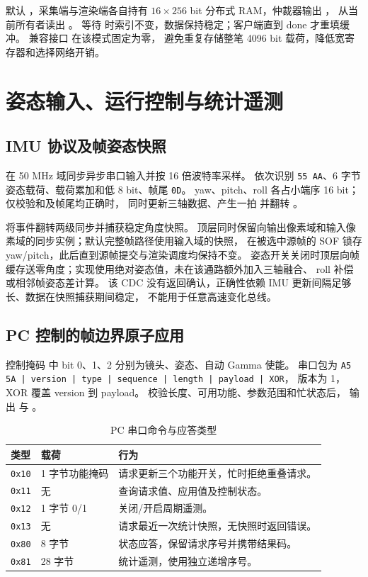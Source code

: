 默认 ，采集端与渲染端各自持有
$16\times256$ bit 分布式 RAM，仲裁器输出 ，
从当前所有者读出 。
等待  时索引不变，数据保持稳定；客户端直到 done 才重填缓冲。
兼容接口  在该模式固定为零，
避免重复存储整笔 4096 bit 载荷，降低宽寄存器和选择网络开销。

\section{姿态输入、运行控制与统计遥测}
\subsection{IMU 协议及帧姿态快照}
 在 50 MHz 域同步异步串口输入并按 16 倍波特率采样。
 依次识别
\texttt{55 AA}、6 字节姿态载荷、载荷累加和低 8 bit、帧尾 \texttt{0D}。
yaw、pitch、roll 各占小端序 16 bit；仅校验和及帧尾均正确时，
同时更新三轴数据、产生一拍  并翻转 。

 将事件翻转两级同步并捕获稳定角度快照。
顶层同时保留向输出像素域和输入像素域的同步实例；默认完整帧路径使用输入域的快照，
在被选中源帧的 SOF 锁存 yaw/pitch，此后直到源帧提交与渲染调度均保持不变。
姿态开关关闭时顶层向帧缓存送零角度；实现使用绝对姿态值，未在该通路额外加入三轴融合、
roll 补偿或相邻帧姿态差计算。
该 CDC 没有返回确认，正确性依赖 IMU 更新间隔足够长、数据在快照捕获期间稳定，
不能用于任意高速变化总线。

\subsection{PC 控制的帧边界原子应用}
控制掩码  中 bit 0、1、2 分别为镜头、姿态、自动 Gamma 使能。
串口包为 \texttt{A5 5A | version | type | sequence | length | payload | XOR}，
版本为 1，XOR 覆盖 version 到 payload。
 校验长度、可用功能、参数范围和忙状态后，
输出  与 。
\begin{table}[htbp]\centering\small
\caption{PC 串口命令与应答类型}
\begin{tabularx}{\textwidth}{p{2.2cm}p{3.0cm}Y}
\toprule 类型 & 载荷 & 行为 \\\midrule
\texttt{0x10} & 1 字节功能掩码 & 请求更新三个功能开关，忙时拒绝重叠请求。\\
\texttt{0x11} & 无 & 查询请求值、应用值及控制状态。\\
\texttt{0x12} & 1 字节 0/1 & 关闭/开启周期遥测。\\
\texttt{0x13} & 无 & 请求最近一次统计快照，无快照时返回错误。\\
\texttt{0x80} & 8 字节 & 状态应答，保留请求序号并携带结果码。\\
\texttt{0x81} & 28 字节 & 统计遥测，使用独立递增序号。\\
\bottomrule
\end{tabularx}
\end{table}

